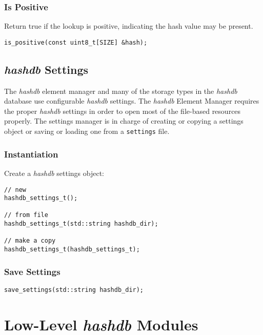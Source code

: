 \documentclass[12pt,twoside]{article}
\newcommand{\hdb}{\emph{hashdb}\xspace}
\begin{document}
\subsubsection{Is Positive}
Return true if the lookup is positive, indicating the hash value may be present.
\begin{small}
\begin{verbatim}
is_positive(const uint8_t[SIZE] &hash);
\end{verbatim}
\end{small}


\subsection{\hdb Settings}
The \hdb element manager and
many of the storage types in the \hdb database use configurable \hdb settings.
The \hdb Element Manager requires the proper \hdb settings
in order to open most of the file-based resources properly.
The settings manager is in charge of creating or copying a settings object
or saving or loading one from a \texttt{settings} file.

\subsubsection{Instantiation}
Create a \hdb settings object:

\begin{small}
\begin{verbatim}
// new
hashdb_settings_t();

// from file
hashdb_settings_t(std::string hashdb_dir);

// make a copy
hashdb_settings_t(hashdb_settings_t);
\end{verbatim}
\end{small}

\subsubsection{Save Settings}
\begin{small}
\begin{verbatim}
save_settings(std::string hashdb_dir);
\end{verbatim}
\end{small}


\section{Low-Level \hdb Modules}
\end{document}
